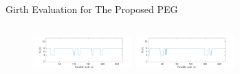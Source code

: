 \documentclass[11pt, aspectratio=169]{beamer}
\begin{document}
\begin{frame}{Girth Evaluation for The Proposed PEG}
\begin{columns}
\begin{column}{0.5\textwidth}
\begin{figure}[tb]
\begin{minipage}{.5\linewidth}
			\end{minipage}
			\begin{minipage}{.5\linewidth}
				\includegraphics[width=1.5in]{gambarafa/girth/girthds7-9.pdf}
			\end{minipage}
			\hfill
				\hspace{-0.8 cm}
			\begin{minipage}{.5\linewidth}
				\hspace{0.45 cm}
				\includegraphics[width=1.5in]{gambarafa/girth/girthds37-45.pdf}
			\end{minipage}
			\label{gambar: girthds}
		\end{figure}
			

\end{column}
\end{columns}
\end{frame}
\end{document}
